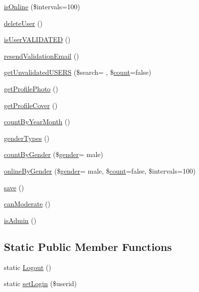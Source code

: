 \begin{DoxyCompactItemize}
\hyperlink{class_ossn_user_a81915715c995de565632dff4af66032b}{is\+Online} (\$intervals=100)
\item 
\hyperlink{class_ossn_user_a7bc7bfa5384d57b7bfd159a47f730466}{delete\+User} ()
\item 
\hyperlink{class_ossn_user_a4f00da3edbb0d2000987ad71947ad8b9}{is\+User\+V\+A\+L\+I\+D\+A\+T\+ED} ()
\item 
\hyperlink{class_ossn_user_a61fc9257b3e0bec9e061a45f081adcf3}{resend\+Validation\+Email} ()
\item 
\hyperlink{class_ossn_user_aa2f53c456cd8699b4a79ddff1d507cdb}{get\+Unvalidated\+U\+S\+E\+RS} (\$search= \textquotesingle{}\textquotesingle{}, \$\hyperlink{photos_2pages_2photos_8php_a364678aa3bd05301b3d1b8650653cf48}{count}=false)
\item 
\hyperlink{class_ossn_user_aff8a05eaa827edda4d8560e61795fc13}{get\+Profile\+Photo} ()
\item 
\hyperlink{class_ossn_user_a8f77354a5caf2549d61c62fe606f3a1f}{get\+Profile\+Cover} ()
\item 
\hyperlink{class_ossn_user_acef7cf678db3f923c9b3aefab11cb6c3}{count\+By\+Year\+Month} ()
\item 
\hyperlink{class_ossn_user_a00afe7d65d7165920380a51ca8404826}{gender\+Types} ()
\item 
\hyperlink{class_ossn_user_a69d1e27767624df490c53128a04f2c4e}{count\+By\+Gender} (\$\hyperlink{actions_2account_8php_a44147631c08dfda5f5bf50dc774f7090}{gender}= \textquotesingle{}male\textquotesingle{})
\item 
\hyperlink{class_ossn_user_ab211695556bc39bc443f9a978b769aef}{online\+By\+Gender} (\$\hyperlink{actions_2account_8php_a44147631c08dfda5f5bf50dc774f7090}{gender}= \textquotesingle{}male\textquotesingle{}, \$\hyperlink{photos_2pages_2photos_8php_a364678aa3bd05301b3d1b8650653cf48}{count}=false, \$intervals=100)
\item 
\hyperlink{class_ossn_user_afc8a3c62679cf00ade9f15fb2a6d6132}{save} ()
\item 
\hyperlink{class_ossn_user_a98d94a0f64c3f7df0eca5671a331fb06}{can\+Moderate} ()
\item 
\hyperlink{class_ossn_user_aabf23b66cd362adaa508de5bfb22706a}{is\+Admin} ()
\end{DoxyCompactItemize}
\subsection*{Static Public Member Functions}
\begin{DoxyCompactItemize}
\item 
static \hyperlink{class_ossn_user_af6f57f96052d0c659ae5200c7e953f7c}{Logout} ()
\item 
static \hyperlink{class_ossn_user_a8a0a23c099246365648988e069b69afa}{set\+Login} (\$userid)
\end{DoxyCompactItemize}


